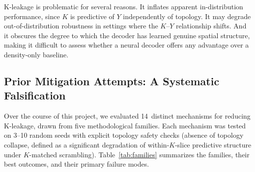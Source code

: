 K-leakage is problematic for several reasons. It inflates apparent in-distribution performance, since $K$ is predictive of $Y$ independently of topology. It may degrade out-of-distribution robustness in settings where the $K$--$Y$ relationship shifts. And it obscures the degree to which the decoder has learned genuine spatial structure, making it difficult to assess whether a neural decoder offers any advantage over a density-only baseline.

\subsection{Prior Mitigation Attempts: A Systematic Falsification}
\label{sec:prior_attempts}

Over the course of this project, we evaluated 14~distinct mechanisms for reducing K-leakage, drawn from five methodological families. Each mechanism was tested on 3--10 random seeds with explicit topology safety checks (absence of topology collapse, defined as a significant degradation of within-$K$-slice predictive structure under $K$-matched scrambling). Table~\ref{tab:families} summarizes the families, their best outcomes, and their primary failure modes.

